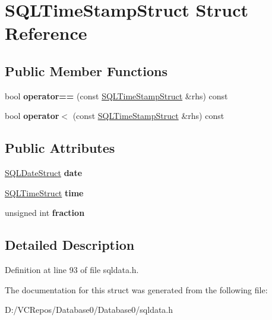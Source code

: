 \hypertarget{struct_s_q_l_time_stamp_struct}{}\section{S\+Q\+L\+Time\+Stamp\+Struct Struct Reference}
\label{struct_s_q_l_time_stamp_struct}
\subsection*{Public Member Functions}
\begin{DoxyCompactItemize}
\item 
\mbox{\label{struct_s_q_l_time_stamp_struct_acdc461869371b0eb75cc4d9ffb2cfd8d}} 
bool {\bfseries operator==} (const \mbox{\hyperlink{struct_s_q_l_time_stamp_struct}{S\+Q\+L\+Time\+Stamp\+Struct}} \&rhs) const
\item 
\mbox{\label{struct_s_q_l_time_stamp_struct_a4bd8990c7394d16f339bbdaaafe9434c}} 
bool {\bfseries operator$<$} (const \mbox{\hyperlink{struct_s_q_l_time_stamp_struct}{S\+Q\+L\+Time\+Stamp\+Struct}} \&rhs) const
\end{DoxyCompactItemize}
\subsection*{Public Attributes}
\begin{DoxyCompactItemize}
\item 
\mbox{\label{struct_s_q_l_time_stamp_struct_a280a4a6cfc4df0376fde12579ce8c882}} 
\mbox{\hyperlink{struct_s_q_l_date_struct}{S\+Q\+L\+Date\+Struct}} {\bfseries date}
\item 
\mbox{\label{struct_s_q_l_time_stamp_struct_a4ab8fa2ba5bfded53c2a4515062af268}} 
\mbox{\hyperlink{struct_s_q_l_time_struct}{S\+Q\+L\+Time\+Struct}} {\bfseries time}
\item 
\mbox{\label{struct_s_q_l_time_stamp_struct_acacc59bce145289a4e8b6559307d55c4}} 
unsigned int {\bfseries fraction}
\end{DoxyCompactItemize}


\subsection{Detailed Description}


Definition at line 93 of file sqldata.\+h.



The documentation for this struct was generated from the following file\+:\begin{DoxyCompactItemize}
\item 
D\+:/\+V\+C\+Repos/\+Database0/\+Database0/sqldata.\+h\end{DoxyCompactItemize}
